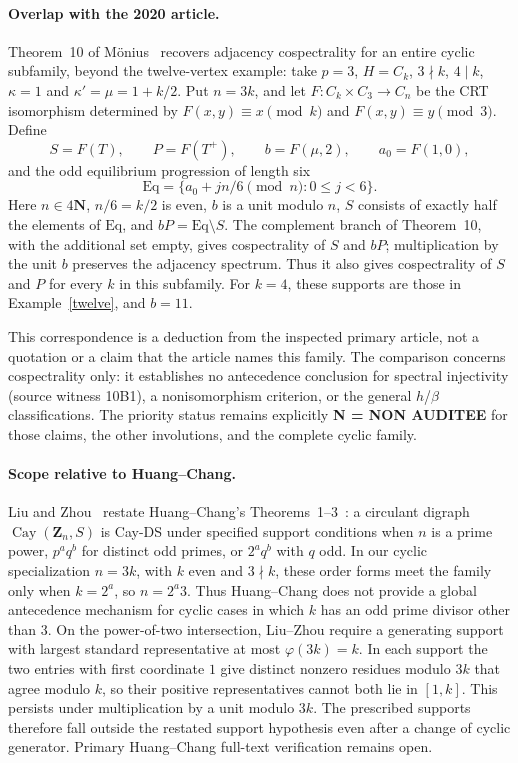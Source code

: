 \documentclass[11pt]{article}
\theoremstyle{remark}\newtheorem{remark}[theorem]{Remark}
\begin{document}
\paragraph{Overlap with the 2020 article.}
Theorem~10 of M\"onius~\cite[pp.~54--55]{Moenius2020} recovers adjacency cospectrality for an entire cyclic subfamily, beyond the twelve-vertex example: take $p=3$, $H=C_k$, $3\nmid k$, $4\mid k$, $\kappa=1$ and $\kappa'=\mu=1+k/2$. Put $n=3k$, and let $F:C_k\times C_3\to C_n$ be the CRT isomorphism determined by $F(x,y)\equiv x\pmod{k}$ and $F(x,y)\equiv y\pmod{3}$. Define
\[
S=F(T),\qquad P=F(T^+),\qquad b=F(\mu,2),\qquad a_0=F(1,0),
\]
and the odd equilibrium progression of length six
\[
\mathrm{Eq}=\{a_0+j n/6\pmod n:0\leq j<6\}.
\]
Here $n\in4\mathbf N$, $n/6=k/2$ is even, $b$ is a unit modulo $n$, $S$ consists of exactly half the elements of $\mathrm{Eq}$, and $bP=\mathrm{Eq}\setminus S$. The complement branch of Theorem~10, with the additional set empty, gives cospectrality of $S$ and $bP$; multiplication by the unit $b$ preserves the adjacency spectrum. Thus it also gives cospectrality of $S$ and $P$ for every $k$ in this subfamily. For $k=4$, these supports are those in Example~\ref{twelve}, and $b=11$.

This correspondence is a deduction from the inspected primary article, not a quotation or a claim that the article names this family. The comparison concerns cospectrality only: it establishes no antecedence conclusion for spectral injectivity (source witness 10B1), a nonisomorphism criterion, or the general $h$/$\beta$ classifications. The priority status remains explicitly \textbf{N = NON AUDITEE} for those claims, the other involutions, and the complete cyclic family.

\paragraph{Scope relative to Huang--Chang.}
Liu and Zhou~\cite[Theorem~93]{LZ} restate Huang--Chang's Theorems~1--3~\cite{HC}: a circulant digraph $\operatorname{Cay}(\mathbf Z_n,S)$ is Cay-DS under specified support conditions when $n$ is a prime power, $p^a q^b$ for distinct odd primes, or $2^a q^b$ with $q$ odd. In our cyclic specialization $n=3k$, with $k$ even and $3\nmid k$, these order forms meet the family only when $k=2^a$, so $n=2^a3$. Thus Huang--Chang does not provide a global antecedence mechanism for cyclic cases in which $k$ has an odd prime divisor other than $3$. On the power-of-two intersection, Liu--Zhou require a generating support with largest standard representative at most $\varphi(3k)=k$. In each support the two entries with first coordinate $1$ give distinct nonzero residues modulo $3k$ that agree modulo $k$, so their positive representatives cannot both lie in $[1,k]$. This persists under multiplication by a unit modulo $3k$. The prescribed supports therefore fall outside the restated support hypothesis even after a change of cyclic generator. Primary Huang--Chang full-text verification remains open.
\end{document}
